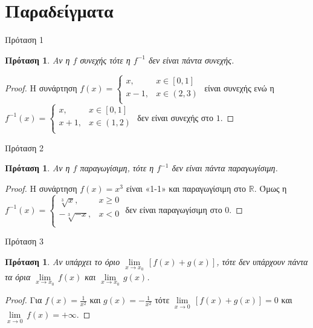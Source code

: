 \documentclass[greek]{beamer}
\newtheorem{proposition}[theorem]{Πρόταση}
\begin{document}
\section{Παραδείγματα}
\begin{frame}{Πρόταση 1}
 \begin{proposition}
  \normalfont Αν η $f$ συνεχής τότε η $f^{-1}$ δεν είναι πάντα συνεχής.
 \end{proposition}
 \begin{proof}
  Η συνάρτηση $f\left( x \right)=\left\{ \begin{array}{*{35}{l}}
    x,   & x\in \left[ 0,1 \right] \\
    x-1, & x\in \left( 2,3 \right) \\
   \end{array} \right.$ είναι συνεχής ενώ η ${{f}^{-1}}\left( x \right)=\left\{ \begin{array}{*{35}{l}}
    x,   & x\in \left[ 0,1 \right] \\
    x+1, & x\in \left( 1,2 \right) \\
   \end{array} \right.$ δεν είναι συνεχής στο $1$.
 \end{proof}
\end{frame}

\begin{frame}{Πρόταση 2}
 \begin{proposition}
  \normalfont Αν η $f$ παραγωγίσιμη, τότε η $f^{-1}$ δεν είναι πάντα παραγωγίσιμη.
 \end{proposition}
 \begin{proof}
  Η συνάρτηση $f\left( x \right)={{x}^{3}}$ είναι «1-1» και παραγωγίσιμη στο $\mathbb{R}$. Όμως η ${{f}^{-1}}\left( x \right)=\left\{ \begin{array}{*{35}{l}}
    \sqrt[3]{x},   & x\ge 0 \\
    -\sqrt[3]{-x}, & x<0    \\
   \end{array} \right.$ δεν είναι παραγωγίσιμη στο 0.
 \end{proof}
\end{frame}

\begin{frame}{Πρόταση 3}
 \begin{proposition}
  \normalfont Αν υπάρχει το όριο $\underset{x\to {{x}_{0}}}{\mathop{\lim }}\,\left[ f\left( x \right)+g\left( x \right) \right]$, τότε δεν υπάρχουν πάντα τα όρια $\underset{x\to {{x}_{0}}}{\mathop{\lim }}\,f\left( x \right)$ και $\underset{x\to {{x}_{0}}}{\mathop{\lim }}\,g\left( x \right)$.
 \end{proposition}
 \begin{proof}
  Για $f\left( x \right)=\frac{1}{{{x}^{2}}}$ και $g\left( x \right)=-\frac{1}{{{x}^{2}}}$ τότε $\underset{x\to 0}{\mathop{\lim }}\,\left[ f\left( x \right)+g\left( x \right) \right]=0$ και $\underset{x\to 0}{\mathop{\lim }}\,f\left( x \right)=+\infty $.
 \end{proof}
\end{frame}
\end{document}
